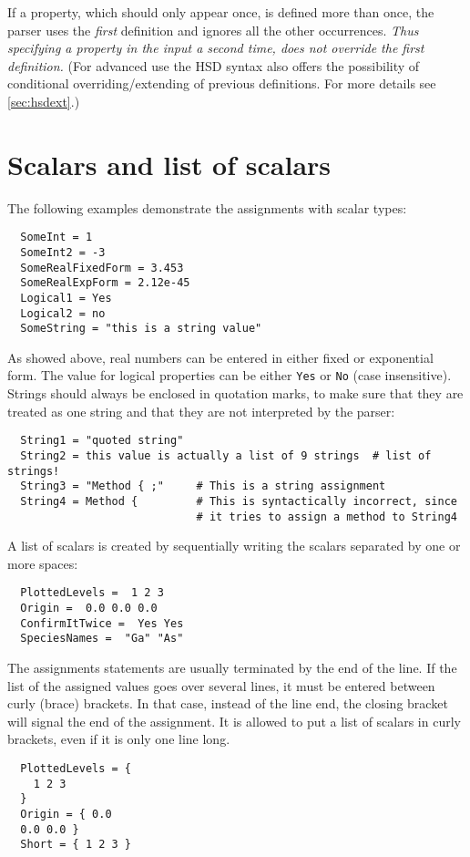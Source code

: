 If a property, which should only appear once, is defined more than once, the
parser uses the \emph{first} definition and ignores all the other occurrences.
\emph{Thus specifying a property in the input a second time, does not override
  the first definition.} (For advanced use the HSD syntax also offers the
possibility of conditional overriding/extending of previous definitions. For
more details see \ref{sec:hsdext}.)


\section{Scalars and list of scalars}

The following examples demonstrate the assignments with scalar types:
\begin{verbatim}
  SomeInt = 1
  SomeInt2 = -3
  SomeRealFixedForm = 3.453
  SomeRealExpForm = 2.12e-45
  Logical1 = Yes
  Logical2 = no
  SomeString = "this is a string value"
\end{verbatim}

As showed above, real numbers can be entered in either fixed or
exponential form. The value for logical properties can be either
\verb|Yes| or \verb|No| (case insensitive). Strings should always be
enclosed in quotation marks, to make sure that they are treated as one
string and that they are not interpreted by the parser:
\begin{verbatim}
  String1 = "quoted string"
  String2 = this value is actually a list of 9 strings  # list of strings!
  String3 = "Method { ;"     # This is a string assignment
  String4 = Method {         # This is syntactically incorrect, since
                             # it tries to assign a method to String4
\end{verbatim}

A list of scalars is created by sequentially writing the scalars
separated by one or more spaces:
\begin{verbatim}
  PlottedLevels =  1 2 3
  Origin =  0.0 0.0 0.0
  ConfirmItTwice =  Yes Yes
  SpeciesNames =  "Ga" "As"
\end{verbatim}

The assignments statements are usually terminated by the end of the
line.  If the list of the assigned values goes over several lines, it
must be entered between curly (brace) brackets. In that case, instead
of the line end, the closing bracket will signal the end of the
assignment.  It is allowed to put a list of scalars in curly brackets,
even if it is only one line long.
\begin{verbatim}
  PlottedLevels = {
    1 2 3
  }
  Origin = { 0.0
  0.0 0.0 }
  Short = { 1 2 3 }
\end{verbatim}

